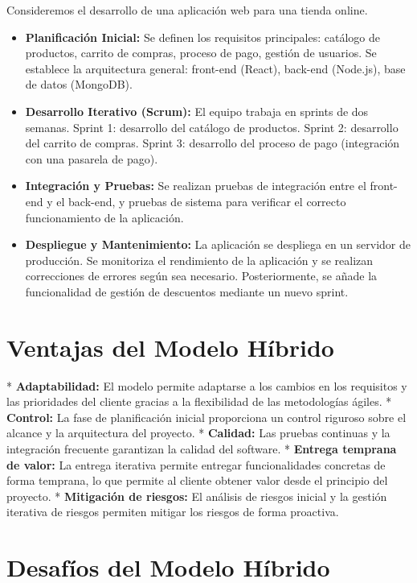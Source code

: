 \documentclass[12pt, spanish]{article}
\begin{document}
Consideremos el desarrollo de una aplicación web para una tienda online.

\begin{itemize}
    \item \textbf{Planificación Inicial:} Se definen los requisitos principales: catálogo de productos, carrito de compras, proceso de pago, gestión de usuarios. Se establece la arquitectura general: front-end (React), back-end (Node.js), base de datos (MongoDB).
    \item \textbf{Desarrollo Iterativo (Scrum):} El equipo trabaja en sprints de dos semanas.  Sprint 1:  desarrollo del catálogo de productos.  Sprint 2: desarrollo del carrito de compras.  Sprint 3: desarrollo del proceso de pago (integración con una pasarela de pago).
    \item \textbf{Integración y Pruebas:} Se realizan pruebas de integración entre el front-end y el back-end, y pruebas de sistema para verificar el correcto funcionamiento de la aplicación.
    \item \textbf{Despliegue y Mantenimiento:}  La aplicación se despliega en un servidor de producción.  Se monitoriza el rendimiento de la aplicación y se realizan correcciones de errores según sea necesario.  Posteriormente, se añade la funcionalidad de gestión de descuentos mediante un nuevo sprint.
\end{itemize}

\section{Ventajas del Modelo Híbrido}

*   \textbf{Adaptabilidad:} El modelo permite adaptarse a los cambios en los requisitos y las prioridades del cliente gracias a la flexibilidad de las metodologías ágiles.
*   \textbf{Control:} La fase de planificación inicial proporciona un control riguroso sobre el alcance y la arquitectura del proyecto.
*   \textbf{Calidad:} Las pruebas continuas y la integración frecuente garantizan la calidad del software.
*   \textbf{Entrega temprana de valor:}  La entrega iterativa permite entregar funcionalidades concretas de forma temprana, lo que permite al cliente obtener valor desde el principio del proyecto.
*   \textbf{Mitigación de riesgos:} El análisis de riesgos inicial y la gestión iterativa de riesgos permiten mitigar los riesgos de forma proactiva.

\section{Desafíos del Modelo Híbrido}
\end{document}
